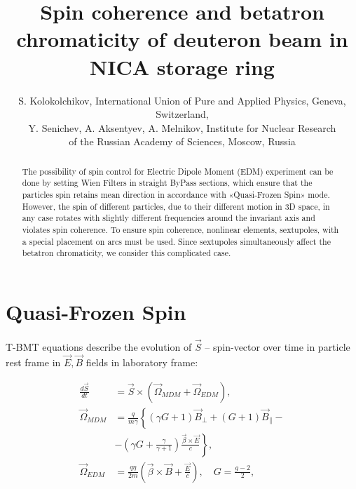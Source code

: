 \documentclass[a4paper,
               keeplastbox,   %
               ]{jacow}
\begin{document}
\title{Spin coherence and betatron chromaticity of deuteron beam in NICA storage ring}

\author{S. Kolokolchikov, International Union of Pure and Applied Physics, Geneva, Switzerland,\\
Y. Senichev, A. Aksentyev, A. Melnikov, Institute for Nuclear Research 
\\of the Russian Academy of Sciences, Moscow, Russia\\}

\maketitle

%
\begin{abstract}
\par The possibility of spin control for Electric Dipole Moment (EDM) experiment can be done by setting Wien Filters in straight ByPass sections, which ensure that the particles spin retains mean direction in accordance with «Quasi-Frozen Spin» mode.
However, the spin of different particles, due to their different motion in 3D space, in any case rotates with
slightly different frequencies around the invariant axis and violates spin coherence. To ensure spin
coherence, nonlinear elements, sextupoles, with a special placement on arcs must be used. Since sextupoles
simultaneously affect the betatron chromaticity, we consider this complicated case.

\end{abstract}

\section{Quasi-Frozen Spin}

\par T-BMT equations describe the evolution of $\vec{S}$ – spin-vector over time in particle rest frame in $\vec{E}, \vec{B}$ fields in laboratory frame:

\begin{equation}\label{eq:T-BMT}
\begin{aligned}
\frac{{d \vec{S}}}{d t} &=\vec{S} \times\left(\vec{\Omega}_{MDM}+\vec{\Omega}_{EDM}\right), \\
\vec{\Omega}_{MDM}&=\frac{q}{m \gamma}\left\{(\gamma G+1)\vec{B}_{\perp}+(G+1)\vec{B}_{\parallel}-\right. \\
&\left.-\left(\gamma G+\frac{\gamma}{\gamma+1}\right) \frac{\vec{\beta} \times \vec{E}}{c}\right\}, \\
\vec{\Omega}_{EDM}&=\frac{q \eta}{2 m}\left(\vec{\beta} \times \vec{B}+\frac{\vec{E}}{c}\right), \quad G=\frac{g-2}{2},
\end{aligned} 
\end{equation}
\end{document}
